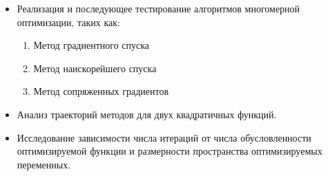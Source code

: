 \begin{itemize}
    \item Реализация и последующее тестирование алгоритмов многомерной оптимизации, таких как:
    \begin{enumerate}
        \item Метод градиентного спуска
        \item Метод наискорейшего спуска
        \item Метод сопряженных градиентов
    \end{enumerate}
    \item Анализ траекторий методов для двух квадратичных функций.
    \item Исследование зависимости числа итераций от числа обусловленности оптимизируемой функции и размерности пространства оптимизируемых переменных.
\end{itemize}

\newpage